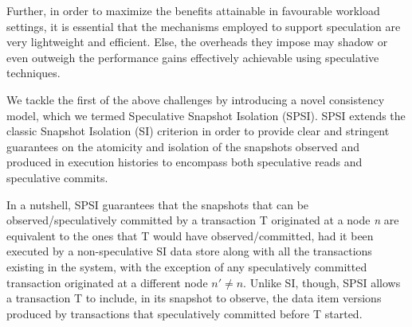 Further, in order to maximize the benefits attainable in favourable workload settings, it is essential that the mechanisms employed to support speculation are very lightweight and efficient. Else, the overheads they impose may shadow or even outweigh the performance gains effectively achievable using speculative techniques.


We tackle the first of the above challenges by introducing a novel consistency model, which we termed Speculative Snapshot Isolation (SPSI). SPSI extends the classic Snapshot  Isolation (SI) criterion in order to provide clear and stringent guarantees on the atomicity and isolation of the snapshots observed and produced in execution histories to encompass both speculative reads and speculative commits.  %

 
In a nutshell, SPSI guarantees that the snapshots that can be observed/speculatively committed by a transaction T originated at a node \textit{n}
 are equivalent to the ones that T would have observed/committed, had it been executed by a non-speculative SI data store along with all the transactions existing in the system, with the exception of any speculatively committed transaction originated at a different node $n'\neq n$. Unlike SI, though, SPSI allows a transaction T to include, in its snapshot to observe, the data item versions produced by transactions that speculatively committed before T started.
 
